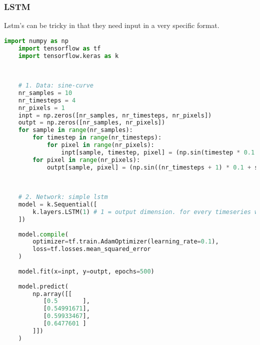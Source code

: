 \subsubsection{LSTM}
Lstm's can be tricky in that they need input in a very specific format.
\begin{lstlisting}[language=python]
    import numpy as np
    import tensorflow as tf
    import tensorflow.keras as k
    
    
    
    # 1. Data: sine-curve
    nr_samples = 10
    nr_timesteps = 4
    nr_pixels = 1
    inpt = np.zeros([nr_samples, nr_timesteps, nr_pixels])
    outpt = np.zeros([nr_samples, nr_pixels])
    for sample in range(nr_samples):
        for timestep in range(nr_timesteps):
            for pixel in range(nr_pixels):
                inpt[sample, timestep, pixel] = (np.sin(timestep * 0.1 + sample) + 1.0) / 2.0
        for pixel in range(nr_pixels):
            outpt[sample, pixel] = (np.sin((nr_timesteps + 1) * 0.1 + sample) + 1.0) / 2.0
        
    
    
    # 2. Network: simple lstm
    model = k.Sequential([
        k.layers.LSTM(1) # 1 = output dimension. for every timeseries we pass in, we want the one next value
    ])
    
    model.compile(
        optimizer=tf.train.AdamOptimizer(learning_rate=0.1),
        loss=tf.losses.mean_squared_error
    )
    
    model.fit(x=inpt, y=outpt, epochs=500)
    
    model.predict(
        np.array([[
           [0.5       ],
           [0.54991671],
           [0.59933467],
           [0.6477601 ]
        ]])
    )
    
\end{lstlisting}